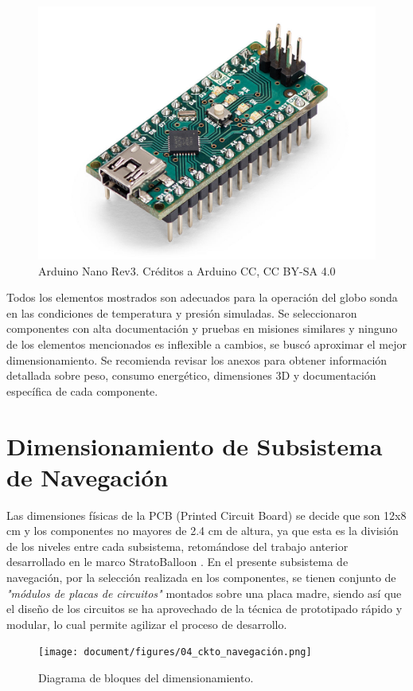 \begin{itemize}
\begin{figure}[h]
    \centering
    \includegraphics[width=0.25\linewidth]{document/figures/04_arduino_nano_v3.jpg}
    \caption{Arduino Nano Rev3.  Créditos a Arduino CC, CC BY-SA 4.0}
    \label{fig:micro}
\end{figure}

\end{itemize}

\vspace{0.5cm}

Todos los elementos mostrados son adecuados para la operación del globo sonda en las condiciones de temperatura y presión simuladas. Se seleccionaron componentes con alta documentación y pruebas en misiones similares y ninguno de los elementos mencionados es inflexible a cambios,  se buscó aproximar el mejor dimensionamiento. Se recomienda revisar los anexos para obtener información detallada sobre peso, consumo energético, dimensiones 3D y documentación específica de cada componente.

\newpage

\section{Dimensionamiento de Subsistema de Navegación}

Las dimensiones físicas de la PCB (Printed Circuit Board) se decide que son 12x8 cm y los componentes no mayores de 2.4 cm de altura, ya que esta es la división de los niveles entre cada subsistema, retomándose del trabajo anterior desarrollado en le marco StratoBalloon \cite{tesis_estructura_stratoballoon}. En el presente subsistema de navegación, por la selección realizada en los componentes, se  tienen conjunto de \textit{"módulos de placas de circuitos"} montados sobre una placa madre, siendo así que el diseño de los circuitos se ha aprovechado de la técnica de prototipado rápido y modular, lo cual permite agilizar el proceso de desarrollo.

\begin{figure}[h]
    \centering
    \texttt{[image: document/figures/04\_ckto\_navegación.png]}
    \caption{Diagrama de bloques del dimensionamiento.}
    \label{fig:diagrama_dimensionamiento}
\end{figure}

